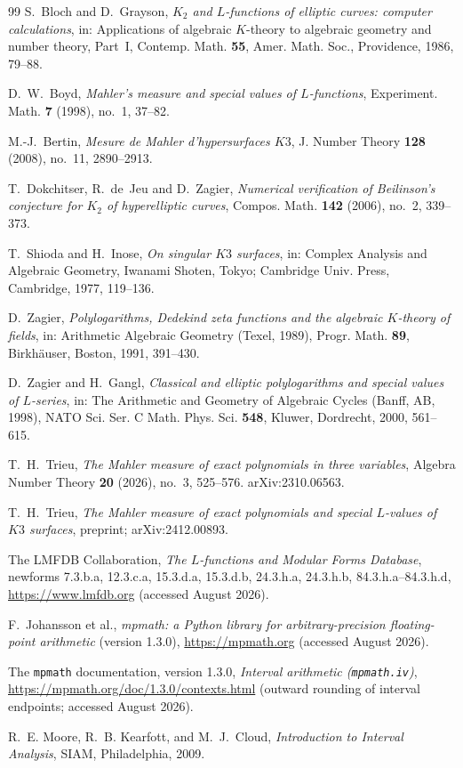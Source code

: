 \documentclass[11pt]{article}
\theoremstyle{definition}
\theoremstyle{remark}
\begin{document}
\begin{thebibliography}{99}
S.~Bloch and D.~Grayson,
\emph{$K_2$ and $L$-functions of elliptic curves: computer
calculations},
in: Applications of algebraic $K$-theory to algebraic geometry and
number theory, Part~I,
Contemp. Math. \textbf{55}, Amer. Math. Soc., Providence, 1986,
79--88.

D.~W.~Boyd,
\emph{Mahler's measure and special values of $L$-functions},
Experiment. Math. \textbf{7} (1998), no.~1, 37--82.

M.-J.~Bertin,
\emph{Mesure de Mahler d'hypersurfaces $K3$},
J. Number Theory \textbf{128} (2008), no.~11, 2890--2913.

T.~Dokchitser, R.~de~Jeu and D.~Zagier,
\emph{Numerical verification of Beilinson's conjecture for $K_2$ of
hyperelliptic curves},
Compos. Math. \textbf{142} (2006), no.~2, 339--373.

T.~Shioda and H.~Inose,
\emph{On singular $K3$ surfaces},
in: Complex Analysis and Algebraic Geometry,
Iwanami Shoten, Tokyo; Cambridge Univ. Press, Cambridge, 1977,
119--136.

D.~Zagier,
\emph{Polylogarithms, Dedekind zeta functions and the algebraic
$K$-theory of fields},
in: Arithmetic Algebraic Geometry (Texel, 1989),
Progr. Math. \textbf{89}, Birkh\"auser, Boston, 1991, 391--430.

D.~Zagier and H.~Gangl,
\emph{Classical and elliptic polylogarithms and special values of
$L$-series},
in: The Arithmetic and Geometry of Algebraic Cycles (Banff, AB,
1998), NATO Sci. Ser. C Math. Phys. Sci. \textbf{548}, Kluwer,
Dordrecht, 2000, 561--615.

T.~H.~Trieu,
\emph{The Mahler measure of exact polynomials in three variables},
Algebra Number Theory \textbf{20} (2026), no.~3, 525--576.
arXiv:2310.06563.

T.~H.~Trieu,
\emph{The Mahler measure of exact polynomials and special $L$-values
of $K3$ surfaces},
preprint; arXiv:2412.00893.

The LMFDB Collaboration,
\emph{The $L$-functions and Modular Forms Database},
newforms \textsf{7.3.b.a}, \textsf{12.3.c.a}, \textsf{15.3.d.a},
\textsf{15.3.d.b}, \textsf{24.3.h.a},
\textsf{24.3.h.b}, \textsf{84.3.h.a}--\textsf{84.3.h.d},
\url{https://www.lmfdb.org}
(accessed August 2026).

F.~Johansson et al.,
\emph{mpmath: a Python library for arbitrary-precision floating-point
arithmetic} (version 1.3.0), \url{https://mpmath.org}
(accessed August 2026).

The \texttt{mpmath} documentation, version 1.3.0,
\emph{Interval arithmetic (\texttt{mpmath.iv})},
\url{https://mpmath.org/doc/1.3.0/contexts.html}
(outward rounding of interval endpoints; accessed August 2026).

R.~E. Moore, R.~B. Kearfott, and M.~J.~Cloud,
\emph{Introduction to Interval Analysis},
SIAM, Philadelphia, 2009.

\end{thebibliography}
\end{document}
